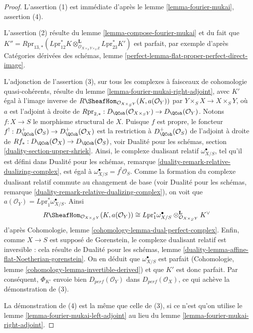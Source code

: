 \begin{proof}
L'assertion (1) est immédiate d'après le lemme \ref{lemma-fourier-mukai}, assertion (4).

\medskip\noindent
L'assertion (2) résulte du lemme \ref{lemma-compose-fourier-mukai} et du
fait que
$K'' = R\text{pr}_{13, *}(
L\text{pr}_{12}^*K
\otimes_{\mathcal{O}_{X \times_S Y \times_S Z}}^\mathbf{L}
L\text{pr}_{23}^*K')$ est parfait, par exemple d'après
Catégories dérivées des schémas, lemme
\ref{perfect-lemma-flat-proper-perfect-direct-image}.

\medskip\noindent
L'adjonction de l'assertion (3), sur tous les complexes à faisceaux de cohomologie
quasi-cohérents, résulte du lemme \ref{lemma-fourier-mukai-right-adjoint}, avec
$K'$ égal à l'image inverse de
$R\SheafHom_{\mathcal{O}_{X \times_S Y}}(K, a(\mathcal{O}_Y))$
par $Y \times_S X \to X \times_S Y$, où $a$ est l'adjoint à droite
de $R\text{pr}_{2, *} : D_\QCoh(\mathcal{O}_{X \times_S Y}) \to
D_\QCoh(\mathcal{O}_Y)$. Notons $f : X \to S$ le morphisme structural de $X$.
Puisque $f$ est propre, le foncteur
$f^! : D_\QCoh^+(\mathcal{O}_S) \to D_\QCoh^+(\mathcal{O}_X)$
est la restriction à $D_\QCoh^+(\mathcal{O}_S)$
de l'adjoint à droite de
$Rf_* : D_\QCoh(\mathcal{O}_X) \to D_\QCoh(\mathcal{O}_S)$, voir
Dualité pour les schémas, section \ref{duality-section-upper-shriek}.
Ainsi, le complexe dualisant relatif $\omega_{X/S}^\bullet$, tel qu'il est défini dans
Dualité pour les schémas, remarque
\ref{duality-remark-relative-dualizing-complex},
est égal à $\omega_{X/S}^\bullet = f^!\mathcal{O}_S$.
Comme la formation du complexe dualisant relatif
commute au changement de base (voir Dualité pour les schémas, remarque
\ref{duality-remark-relative-dualizing-complex}), on voit que
$a(\mathcal{O}_Y) = L\text{pr}_1^*\omega_{X/S}^\bullet$.
Ainsi
$$
R\SheafHom_{\mathcal{O}_{X \times_S Y}}(K, a(\mathcal{O}_Y))
\cong
L\text{pr}_1^*\omega_{X/S}^\bullet
\otimes_{\mathcal{O}_{X \times_S Y}}^\mathbf{L} K^\vee
$$
d'après Cohomologie, lemme \ref{cohomology-lemma-dual-perfect-complex}.
Enfin, comme $X \to S$ est supposé de Gorenstein, le complexe dualisant relatif
est inversible : cela résulte de Dualité pour les schémas, lemme
\ref{duality-lemma-affine-flat-Noetherian-gorenstein}.
On en déduit que $\omega_{X/S}^\bullet$ est parfait
(Cohomologie, lemme \ref{cohomology-lemma-invertible-derived})
et que $K'$ est donc parfait.
Par conséquent, $\Phi_{K'}$ envoie bien $D_{perf}(\mathcal{O}_Y)$
dans $D_{perf}(\mathcal{O}_X)$, ce qui achève la démonstration de (3).

\medskip\noindent
La démonstration de (4) est la même que celle de (3), si ce n'est qu'on utilise
le lemme \ref{lemma-fourier-mukai-left-adjoint} au lieu du
lemme \ref{lemma-fourier-mukai-right-adjoint}.
\end{proof}















